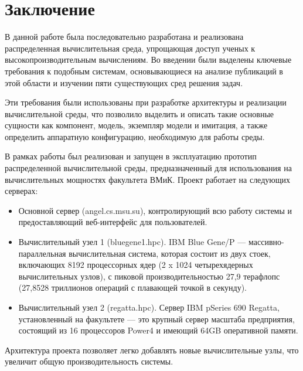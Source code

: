 \section{Заключение}   
\label{conclusion}

В данной работе была последовательно разработана и реализована распределенная вычислительная среда, упрощающая доступ ученых к высокопроизводительным вычислениям. Во введении были выделены ключевые требования к подобным системам, основывающиеся на анализе публикаций в этой области и изучении пяти существующих сред решения задач.

Эти требования были использованы при разработке архитектуры и реализации вычислительной среды, что позволило выделить и описать такие основные сущности как компонент, модель, экземпляр модели и имитация, а также определить аппаратную конфигурацию, необходимую для работы среды.

В рамках работы был реализован и запущен в эксплуатацию прототип распределенной вычислительной среды, предназначенный для использования на вычислительных мощностях факультета ВМиК. Проект работает на следующих серверах:
\begin{itemize}
  \item Основной сервер (angel.cs.msu.su), контролирующий всю работу системы и предоставляющий веб-интерфейс для пользователей.
  \item Вычислительный узел 1 (bluegene1.hpc). IBM Blue Gene/P — массивно-параллельная вычислительная система, которая состоит из двух стоек, включающих 8192 процессорных ядер (2 x 1024 четырехядерных вычислительных узлов), с пиковой производительностью 27,9 терафлопс (27,8528 триллионов операций с плавающей точкой в секунду).   
  \item Вычислительный узел 2 (regatta.hpc). Сервер IBM pSeries 690 Regatta, установленный на факультете --- это крупный сервер масштаба предприятия, состоящий из 16 процессоров Power4 и имеющий 64GB оперативной памяти.
\end{itemize}

Архитектура проекта позволяет легко добавлять новые вычислительные узлы, что увеличит общую производительность системы.

